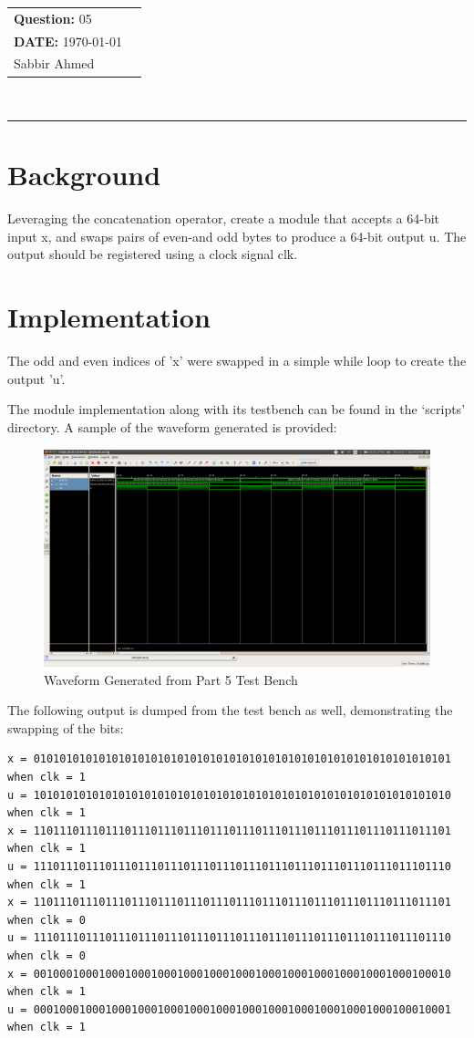 \documentclass[paper=usletter, fontsize=12pt]{article}
\newcommand{\documentinfo}[3]{
    \begin{centering}
        \parbox{2in}{
        \begin{spacing}{1}
            \begin{flushleft}
                \begin{tabular}{l l}
                    #1 \\
                    #2 \\
                    #3 \\
                \end{tabular}\\
                \rule{\textwidth}{1pt}
            \end{flushleft}
        \end{spacing}
        }
    \end{centering}
}
\begin{document}
    \documentinfo{\textbf{Question:} 05}{\textbf{DATE:} \today}{Sabbir Ahmed}
    \vspace{-0.1in}

    \section{Background}
    Leveraging the concatenation operator, create a module that accepts a 64-bit input x, and swaps pairs of even-and odd bytes to produce a 64-bit output u. The output should be registered using a clock signal clk.

    \section{Implementation}
    The odd and even indices of 'x' were swapped in a simple while loop to create the output 'u'.

    The module implementation along with its testbench can be found in the `scripts' directory. A sample of the waveform generated is provided:

    \begin{figure}[ht]
        \begin{center}
            \includegraphics[width=1\textwidth]{wav.png}
            \caption{Waveform Generated from Part 5 Test Bench} \label{fig:wav}
        \end{center}
    \end{figure}

    The following output is dumped from the test bench as well, demonstrating the swapping of the bits:

\begin{lstlisting}[language={}]
x = 0101010101010101010101010101010101010101010101010101010101010101 when clk = 1
u = 1010101010101010101010101010101010101010101010101010101010101010 when clk = 1
x = 1101110111011101110111011101110111011101110111011101110111011101 when clk = 1
u = 1110111011101110111011101110111011101110111011101110111011101110 when clk = 1
x = 1101110111011101110111011101110111011101110111011101110111011101 when clk = 0
u = 1110111011101110111011101110111011101110111011101110111011101110 when clk = 0
x = 0010001000100010001000100010001000100010001000100010001000100010 when clk = 1
u = 0001000100010001000100010001000100010001000100010001000100010001 when clk = 1
\end{lstlisting}
\end{document}
